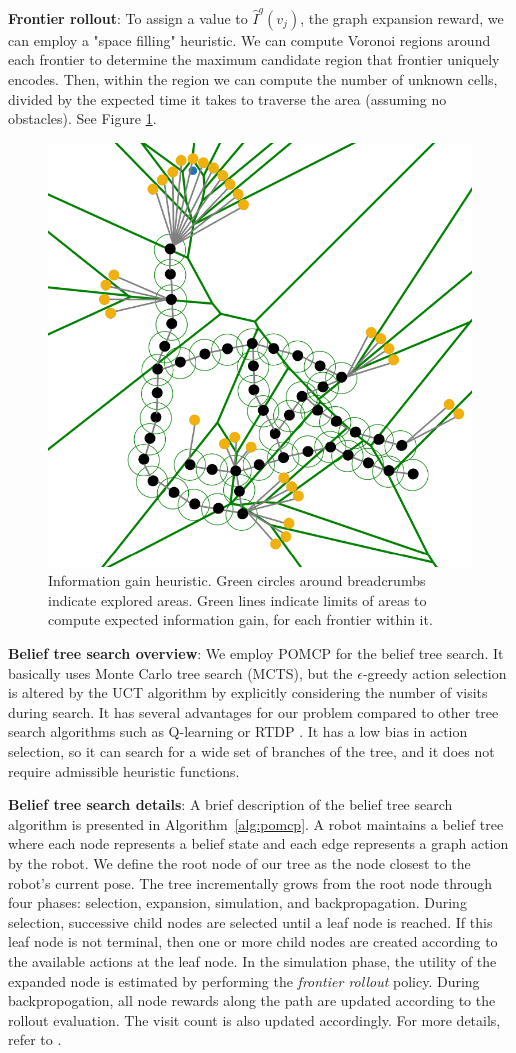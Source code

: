 \documentclass{article}
\newcommand{\ph}[1]{{\textbf{#1}:}} %
\begin{document}
\ph{Frontier rollout}
To assign a value to $\hat{I}^{g}(v_j)$, the graph expansion reward, we can employ a "space filling" heuristic.  We can compute Voronoi regions around each frontier to determine the maximum candidate region that frontier uniquely encodes.  Then, within the region we can compute the number of unknown cells, divided by the expected time it takes to traverse the area (assuming no obstacles).  See Figure \ref{fig:info_heuristic}.

\begin{figure}[ht!]
  \includegraphics[width=.45\textwidth]{figures/irm_voronoi_combined.png}  \caption{Information gain heuristic.  Green circles around breadcrumbs indicate explored areas.  Green lines indicate limits of areas to compute expected information gain, for each frontier within it.}
  \label{fig:info_heuristic}
\end{figure}

\ph{Belief tree search overview}
We employ POMCP \cite{silver2010monte} for the belief tree search.
It basically uses Monte Carlo tree search (MCTS), but the $\epsilon$-greedy action selection is altered by the UCT algorithm by explicitly considering the number of visits during search.
It has several advantages for our problem compared to other tree search algorithms such as Q-learning \cite{watkins1992q} or RTDP \cite{barto1995learning}.
It has a low bias in action selection, so it can search for a wide set of branches of the tree, and it does not require admissible heuristic functions. %

\ph{Belief tree search details}
A brief description of the belief tree search algorithm is presented in Algorithm~\ref{alg:pomcp}.
A robot maintains a belief tree where each node represents a belief state and each edge represents a graph action by the robot. We define the root node of our tree as the node closest to the robot's current pose. The tree incrementally grows from the root node through four phases: selection, expansion, simulation, and backpropagation. During selection, successive child nodes are selected until a leaf node is reached. If this leaf node is not terminal, then one or more child nodes are created according to the available actions at the leaf node. In the simulation phase, the utility of the expanded node is estimated by performing the \emph{frontier rollout} policy. During backpropogation, all node rewards along the path are updated according to the rollout evaluation. The visit count is also updated accordingly. For more details, refer to \cite{silver2010monte}.
\end{document}
